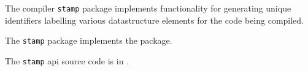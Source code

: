
The compiler {\tt stamp} package implements functionality for generating unique 
identifiers labelling various datastructure elements for the code being compiled.

The {\tt stamp} package implements the  package.

The {\tt stamp} api source code is in .


